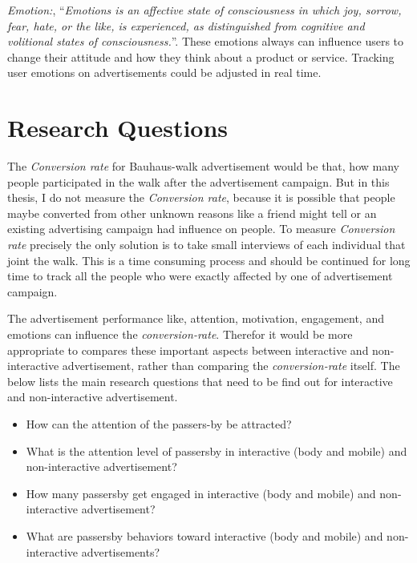 \emph{Emotion:}, ``\emph{Emotions is an affective state of consciousness in which joy, sorrow, fear, hate, or the like, is experienced, as distinguished from cognitive and volitional states of consciousness.}''\cite{emotiondef}. These emotions always can influence users to change their attitude and how they think about a product or service. Tracking user emotions on advertisements could be adjusted in real time.



\section{Research Questions}
The \emph{Conversion rate} for Bauhaus-walk advertisement would be that, how many people participated in the walk after the advertisement campaign. But in this thesis, I do not measure the \emph{Conversion rate}, because it is possible that people maybe converted from other unknown reasons like a friend might tell or an existing advertising campaign had influence on people. To measure \emph{Conversion rate} precisely the only solution is to take small interviews of each individual that joint the walk. This is a time consuming process and should be continued for long time to track all the people who were exactly affected by one of advertisement campaign.

The advertisement performance like, attention, motivation, engagement, and emotions can influence the \emph{conversion-rate}. Therefor it would be more appropriate to compares these important aspects between interactive and non-interactive advertisement, rather than comparing the \emph{conversion-rate} itself. The below lists the main research questions that need to be find out for interactive and non-interactive advertisement.


\begin{itemize}
\item How can the attention of the passers-by be attracted? 
\item What is the attention level of passersby in interactive (body and mobile) and non-interactive advertisement?
\item How many passersby get engaged in interactive (body and mobile) and non-interactive advertisement?
\item What are passersby behaviors toward interactive (body and mobile) and non-interactive advertisements?
\end{itemize}



